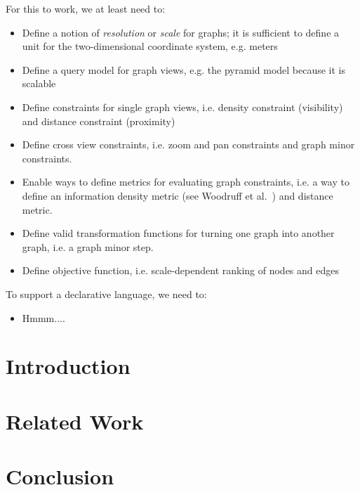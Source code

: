 For this to work, we at least need to:
\begin{itemize}
\item Define a notion of \emph{resolution} or \emph{scale} for graphs; it is sufficient to define a unit for the two-dimensional coordinate system, e.g. meters
\item Define a query model for graph views, e.g. the pyramid model because it is scalable
\item Define constraints for single graph views, i.e. density constraint (visibility) and distance constraint (proximity)
\item Define cross view constraints, i.e. zoom and pan constraints and graph minor constraints.
\item Enable ways to define metrics for evaluating graph constraints, i.e. a way to define an information density metric (see Woodruff et al.~\cite{woodruff1998constant}) and distance metric.
\item Define valid transformation functions for turning one graph into another graph, i.e. a graph minor step.
\item Define objective function, i.e. scale-dependent ranking of nodes and edges
\end{itemize}

To support a declarative language, we need to:

\begin{itemize}
\item Hmmm....
\end{itemize}


\section{Introduction}


\section{Related Work}

\section{Conclusion}